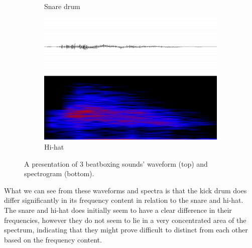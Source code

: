 \begin{figure}[h]
\begin{subfigure}[b]{0.275\textwidth}
		\caption{Snare drum}
		\label{fig:snare-wave}
	\end{subfigure}
	\begin{subfigure}[b]{0.35\textwidth}
		\includegraphics[width=\textwidth]{fig/Hihat-wave.png}
		\caption{Hi-hat}
		\label{fig:hihat-wave}
	\end{subfigure}
	\caption{A presentation of 3 beatboxing sounds' waveform (top) and spectrogram
	\label{fig:chosen-sounds} (bottom).}
\end{figure}

What we can see from these waveforms and spectra is that the kick drum does differ significantly in its frequency content in relation to the snare and hi-hat. The snare and hi-hat does initially seem to have a clear difference in their frequencies, however they do not seem to lie in a very concentrated area of the spectrum, indicating that they might prove difficult to distinct from each other based on the frequency content.